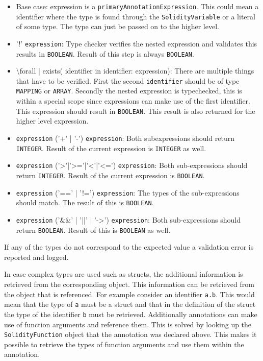 \documentclass[a4paper]{article}
\begin{document}
\begin{itemize}
  \item Base case: expression is a \texttt{primaryAnnotationExpression}. This could mean a identifier where the type is found through the \texttt{SolidityVariable} or a literal of some type. The type can just be passed on to the higher level.
  \item '!' \texttt{expression}: Type checker verifies the nested expression and validates this results in \texttt{BOOLEAN}. Result of this step is always \texttt{BOOLEAN}.
  \item \textbackslash forall | exists( identifier  in identifier: expression): There are multiple things that have to be verified. First the second \texttt{identifier} should be of type \texttt{MAPPING} or \texttt{ARRAY}. Secondly the nested expression is typechecked, this is within a special scope since expressions can make use of the first identifier. This expression should result in \texttt{BOOLEAN}. This result is also returned for the higher level expression.
  \item \texttt{expression} ('+' | '-') \texttt{expression}: Both subexpressions should return \texttt{INTEGER}. Result of the current expression is \texttt{INTEGER} as well.
  \item \texttt{expression} ('>'|'>='|'<'|'<=') \texttt{expression}: Both sub-expressions should return \texttt{INTEGER}. Result of the current expression is \texttt{BOOLEAN}.
  \item \texttt{expression} ('==' | '!=') \texttt{expression}: The types of the sub-expressions should match. The result of this is \texttt{BOOLEAN}.
  \item \texttt{expression} ('\&\&' | '||' | '->') \texttt{expression}: Both sub-expressions should return \texttt{BOOLEAN}. Result of this is \texttt{BOOLEAN} as well.
\end{itemize}
If any of the types do not correspond to the expected value a validation error is reported and logged. \par
In case complex types are used such as structs, the additional information is retrieved from the corresponding object. This information can be retrieved from the object that is referenced. For example consider an identifier \texttt{a.b}. This would mean that the type of \texttt{a} must be a struct and that in the definition of the struct the type of the identifier \texttt{b} must be retrieved. Additionally annotations can make use of function arguments and reference them. This is solved by looking up the \texttt{SolidityFunction} object that the annotation was declared above. This makes it possible to retrieve the types of function arguments and use them within the annotation.
\end{document}
